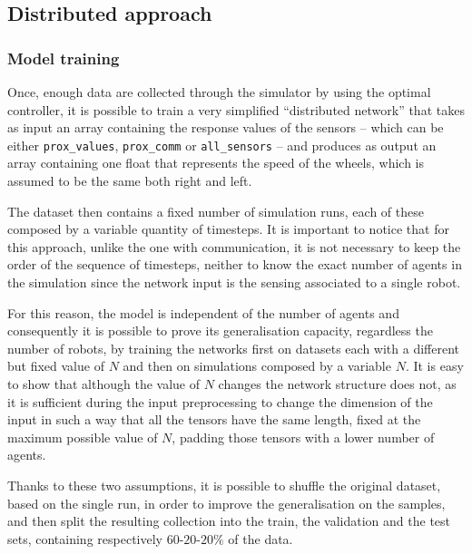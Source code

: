 \subsection{Distributed approach}
\label{subsec:ex1distr}

\subsubsection{Model training}
\label{subsubsec:learneddist}

Once, enough data are collected through the simulator by using the optimal 
controller, it is possible to train a very simplified ``distributed network'' 
that takes as input an array containing the response values of the sensors – 
which can be either \texttt{prox\_values}, \texttt{prox\_comm} or 
\texttt{all\_sensors} – and produces as output an array containing one float 
that represents the speed of the wheels, which is assumed to be the same 
both right and left.

The dataset then contains a fixed number of simulation runs, each of these 
composed by a variable quantity of timesteps. It is important to notice that 
for this approach, unlike the one with communication, it is not necessary to 
keep the order of the sequence of timesteps, neither to know the exact 
number of agents in the simulation since the network input is the sensing 
associated to a single robot.

For this reason, the model is independent of the number of agents and 
consequently it is possible to prove its generalisation capacity, regardless 
the number of robots, by training the networks first on datasets each with a 
different but fixed value of $N$ and then on simulations composed by a 
variable $N$.
It is easy to show that although the value of $N$ changes the network 
structure does not, as it is sufficient during the input preprocessing to 
change the dimension of the input in such a way that all the tensors have 
the same length, fixed at the maximum possible value of $N$, padding 
those tensors with a lower number of agents.

Thanks to these two assumptions, it is possible to shuffle the original 
dataset, based on the single run, in order to improve the generalisation on 
the samples, and then split the resulting collection into the train, the 
validation and the test sets, containing respectively $60$-$20$-$20\%$ of 
the data. 


